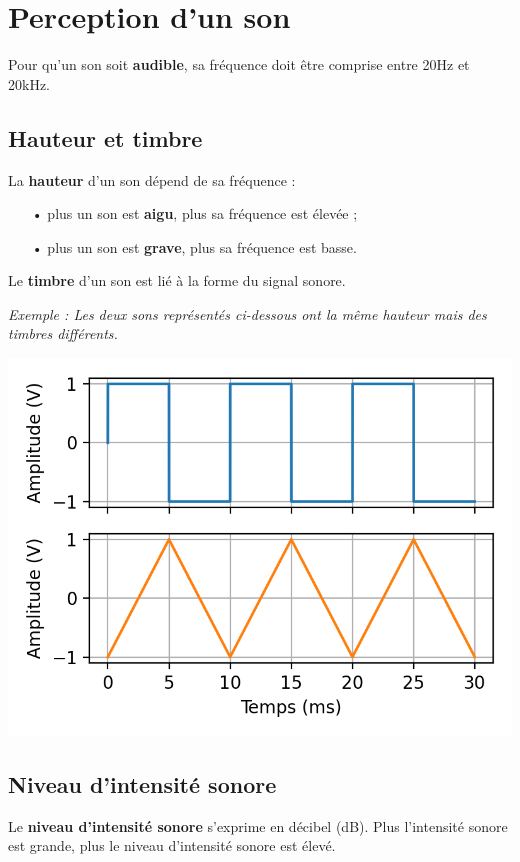 \documentclass[12pt,a5paper]{article}
\begin{document}
\thispagestyle{empty}

\setcounter{section}{2}

\section{Perception d'un son}

Pour qu'un son soit \textbf{audible}, sa fréquence doit être comprise entre \unit{20}{Hz} et \unit{20}{kHz}.
\begin{center}
\end{center}

\subsection{Hauteur et timbre}

La \textbf{hauteur} d'un son dépend de sa fréquence :
\begin{itemize}
\item[•] plus un son est \textbf{aigu}, plus sa fréquence est élevée ;
\item[•] plus un son est \textbf{grave}, plus sa fréquence est basse.
\end{itemize}

Le \textbf{timbre} d'un son est lié à la forme du signal sonore.

\noindent
\textit{
Exemple : Les deux sons représentés ci-dessous ont la même hauteur mais des timbres différents.
}
\begin{center}
\includegraphics[scale=0.75]{images/hauteur_timbre.png}
\end{center}

\subsection{Niveau d'intensité sonore}

Le \textbf{niveau d'intensité sonore} s'exprime en décibel (dB).
Plus l'intensité sonore est grande, plus le niveau d'intensité sonore est élevé.
\end{document}
